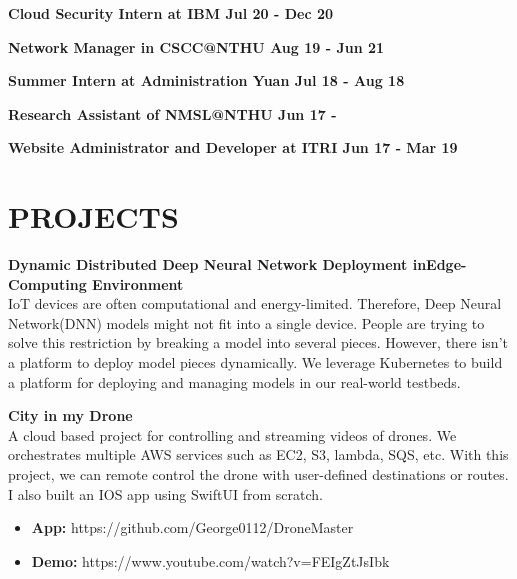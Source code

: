 \documentclass[margin]{res}
\begin{document}
\begin{resume}
\textbf{Cloud Security Intern at IBM \hfill{Jul 20 - Dec 20}\\}

\textbf{Network Manager in CSCC@NTHU \hfill{Aug 19 - Jun 21}\\}

\textbf{Summer Intern at Administration Yuan \hfill{Jul 18 - Aug 18}\\}

\textbf{Research Assistant of NMSL@NTHU \hfill{Jun 17 - }\\}

\textbf{Website Administrator and Developer at ITRI \hfill{Jun 17 - Mar 19}\\}

\section{PROJECTS}

\textbf{Dynamic Distributed Deep Neural Network Deployment inEdge-Computing Environment}\\
IoT devices are often computational and energy-limited. Therefore, Deep Neural Network(DNN) models might not fit into a single device. People are trying to solve this restriction by breaking a model into several pieces. However, there isn't a platform to deploy model pieces dynamically. We leverage Kubernetes to build a platform for deploying and managing models in our real-world testbeds.

\textbf{City in my Drone}\\
A cloud based project for controlling and streaming videos of drones. We orchestrates multiple AWS services such as EC2, S3, lambda, SQS, etc. With this project, we can remote control the drone with user-defined destinations or routes. I also built an IOS app using SwiftUI from scratch.
\\
\begin{itemize}
    \item \textbf{App: } https://github.com/George0112/DroneMaster
    \item \textbf{Demo:} https://www.youtube.com/watch?v=FEIgZtJsIbk
\end{itemize}


\end{resume}
\end{document}
